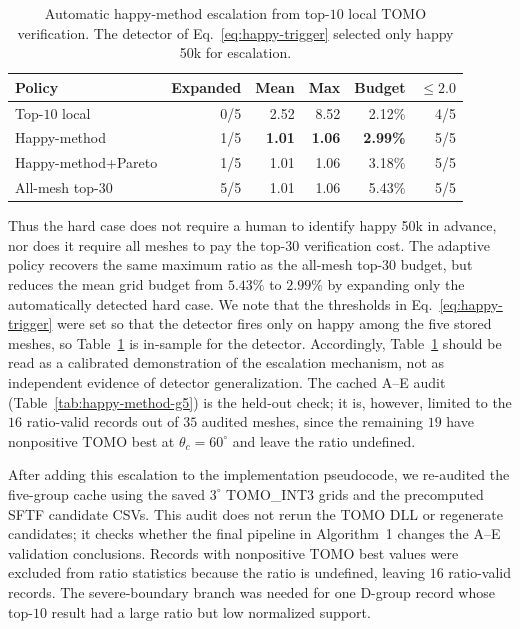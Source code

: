 \documentclass[11pt,a4paper]{article}
\begin{document}
\begin{table}[H]
\centering
\caption{Automatic happy-method escalation from top-$10$ local TOMO verification.
The detector of Eq.~\eqref{eq:happy-trigger} selected only happy 50k for escalation.}
\label{tab:happy-method}
\small
\begin{tabular}{lrrrrr}
\toprule
Policy & Expanded & Mean & Max & Budget & $\le 2.0$\\
\midrule
Top-$10$ local & 0/5 & 2.52 & 8.52 & 2.12\% & 4/5\\
Happy-method & 1/5 & \textbf{1.01} & \textbf{1.06} & \textbf{2.99\%} & 5/5\\
Happy-method+Pareto & 1/5 & 1.01 & 1.06 & 3.18\% & 5/5\\
All-mesh top-$30$ & 5/5 & 1.01 & 1.06 & 5.43\% & 5/5\\
\bottomrule
\end{tabular}
\end{table}

Thus the hard case does not require a human to identify happy 50k in advance,
nor does it require all meshes to pay the top-$30$ verification cost.
The adaptive policy recovers the same maximum ratio as the all-mesh top-$30$ budget,
but reduces the mean grid budget from $5.43\%$ to $2.99\%$ by expanding only the automatically detected hard case.
We note that the thresholds in Eq.~\eqref{eq:happy-trigger} were set so that the detector fires only on happy among
the five stored meshes, so Table~\ref{tab:happy-method} is in-sample for the detector.
Accordingly, Table~\ref{tab:happy-method} should be read as a calibrated demonstration of the escalation mechanism,
not as independent evidence of detector generalization.
The cached A--E audit (Table~\ref{tab:happy-method-g5}) is the held-out check; it is, however, limited to the $16$ ratio-valid records out of $35$ audited meshes,
since the remaining $19$ have nonpositive TOMO best at $\theta_c=60^\circ$ and leave the ratio undefined.

After adding this escalation to the implementation pseudocode, we re-audited the five-group cache using the saved $3^\circ$ TOMO\_INT3 grids and the precomputed SFTF candidate CSVs.
This audit does not rerun the TOMO DLL or regenerate candidates; it checks whether the final pipeline in Algorithm~1 changes the A--E validation conclusions.
Records with nonpositive TOMO best values were excluded from ratio statistics because the ratio is undefined, leaving $16$ ratio-valid records.
The severe-boundary branch was needed for one D-group record whose top-$10$ result had a large ratio but low normalized support.
\end{document}
